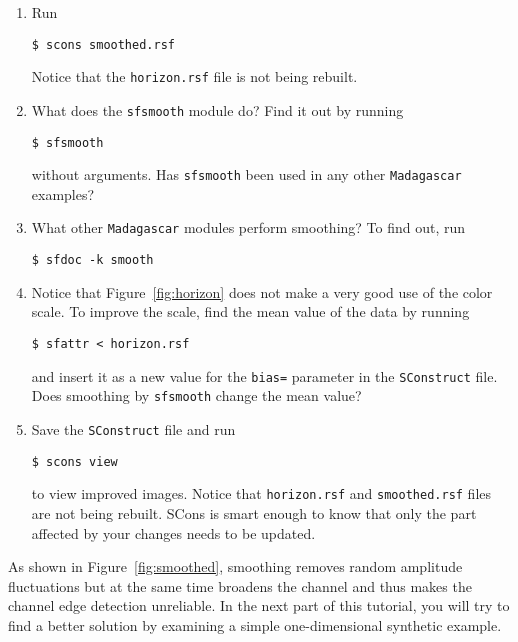 \begin{enumerate}
\answer{
}

\item Run
\begin{verbatim}
$ scons smoothed.rsf
\end{verbatim}
Notice that the \texttt{horizon.rsf} file is not being rebuilt.
\item What does the \texttt{sfsmooth} module do? Find it out by running
\begin{verbatim}
$ sfsmooth
\end{verbatim}
without arguments. Has \texttt{sfsmooth} been used in any other \texttt{Madagascar} examples?

\answer{
}

\item What other \texttt{Madagascar} modules perform smoothing? To find out, run
\begin{verbatim}
$ sfdoc -k smooth
\end{verbatim}
\item Notice that Figure~\ref{fig:horizon} does not make a very good use of the color scale. To improve the scale, find the mean value of the data by running
\begin{verbatim}
$ sfattr < horizon.rsf
\end{verbatim}
and insert it as a new value for the \texttt{bias=} parameter in the
\texttt{SConstruct} file. Does smoothing by \texttt{sfsmooth} change
the mean value?

\answer{
}

\item Save the \texttt{SConstruct} file and run 
\begin{verbatim}
$ scons view
\end{verbatim}
to view improved images. Notice that \texttt{horizon.rsf} and \texttt{smoothed.rsf} files are not being rebuilt. SCons is smart enough to know that only the 
part affected by your changes needs to be updated.
\end{enumerate}

As shown in Figure~\ref{fig:smoothed}, smoothing removes random
amplitude fluctuations but at the same time broadens the channel and thus
makes the channel edge detection unreliable. In the next part of this
tutorial, you will try to find a better solution by examining a simple
one-dimensional synthetic example.


